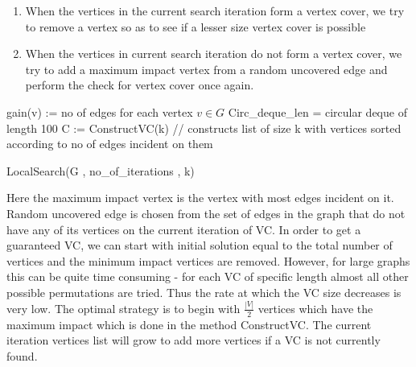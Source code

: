 \begin{enumerate}
\item When the vertices in the current search iteration form a vertex cover, we try to remove a vertex so as to see if a lesser size vertex cover is possible

\item When the vertices in current search iteration do not form a vertex cover, we try to add a maximum impact vertex from a random uncovered edge and perform the check for vertex cover once again.
\end{enumerate}
\begin{algorithm}[ht]
\SetAlgoNoLine
{}
{gain(v) := no of edges for each vertex $v \in G$\;
Circ\_deque\_len = circular deque of length 100\;
C := ConstructVC(k) // constructs list of size k with vertices sorted according to no of edges incident on them\;
}
\caption{LocalSearch(G , no\_of\_iterations , k)}
\end{algorithm}

Here the maximum impact vertex is the vertex with most edges incident on it. Random uncovered edge is chosen from the set of edges in the graph that do not have any of its vertices on the current iteration of VC. In order to get a guaranteed VC, we can start with initial solution equal to the total number of vertices and the minimum impact vertices are removed. However, for large graphs this can be quite time consuming - for each VC of specific length almost all other possible permutations are tried. Thus the rate at which the VC size decreases is very low. The optimal strategy is to begin with $\frac{\left| V \right|}{2}$ vertices which have the maximum impact which is done in the method ConstructVC. The current iteration vertices list will grow to add more vertices if a VC is not currently found.
